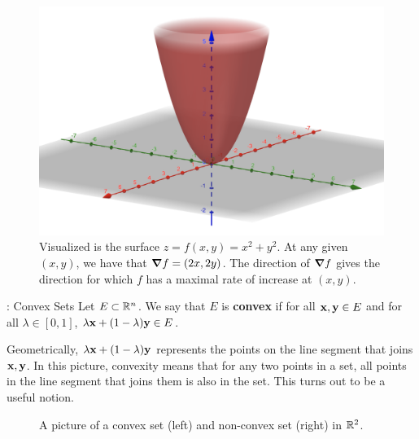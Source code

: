 \begin{figure}[htbp]
    \centering
    \includegraphics[scale=0.4]{Images/zxy.png}
    
    \caption{Visualized is the surface $z = f(x, y) = x^2 + y^2$. At any given $(x, y)$, we have that $\grad{f} = (2x, 2y)$. The direction of $\grad{f}$ gives the direction for which $f$ has a maximal rate of increase at $(x, y)$.}
    \label{fig61}
\end{figure}

\begin{ndef}{: Convex Sets}{}
    Let $E \subset \mathbb{R}^n$. We say that $E$ is \textbf{convex} if for all $\mathbf{x}, \mathbf{y}  \in E$ and for all $\lambda \in [0, 1]$, $\lambda \mathbf{x} + (1 - \lambda)\mathbf{y} \in E$. 
\end{ndef}
\noindent Geometrically, $\lambda \mathbf{x} + (1 - \lambda)\mathbf{y}$ represents the points on the line segment that joins $\mathbf{x}, \mathbf{y}$. In this picture, convexity means that for any two points in a set, all points in the line segment that joins them is also in the set. This turns out to be a useful notion.

\begin{figure}[htbp]
    \centering
    \caption{A picture of a convex set (left) and non-convex set (right) in $\mathbb{R}^2$.}
    \label{fig62}
\end{figure}

